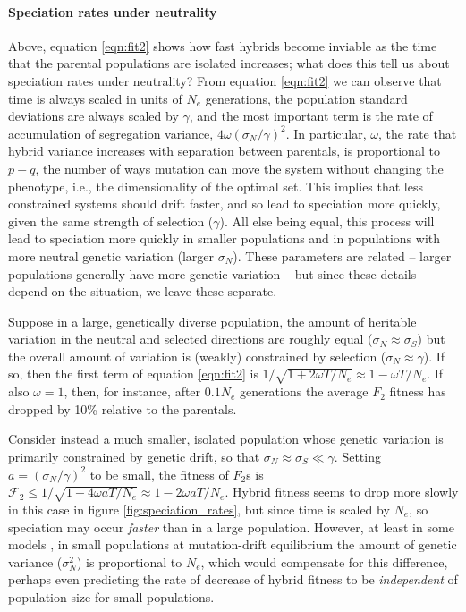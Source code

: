 \documentclass{article}
\newcommand{\plr}[1]{\todo[color=blue!25]{#1}}
\newcommand{\plr}[1]{{\color{blue}\it #1}}
\newcommand{\1}{\mathbbm{1}}
\newcommand{\fit}{\mathcal{F}}
\begin{document}
\paragraph{Speciation rates under neutrality}
Above, equation \eqref{eqn:fit2} shows how fast hybrids become inviable 
as the time that the parental populations are isolated increases;
what does this tell us about speciation rates under neutrality?
From equation \eqref{eqn:fit2} we can observe that
time is always scaled in units of $N_e$ generations,
the population standard deviations are always scaled by $\gamma$,
and the most important term is the rate of accumulation of segregation variance,
$4 \omega (\sigma_N/\gamma)^2$.
In particular, $\omega$, the rate that hybrid variance increases with separation between parentals,
is proportional to $p-q$, the number of ways mutation can move the system without changing the phenotype,
i.e., the dimensionality of the optimal set.
This implies that less constrained systems should drift faster,
and so lead to speciation more quickly, given the same strength of selection ($\gamma$).
\plr{revisit}
All else being equal, this process will lead to speciation more quickly in smaller populations
and in populations with more neutral genetic variation (larger $\sigma_N$).
These parameters are related -- larger populations generally have more genetic variation --
but since these details depend on the situation, we leave these separate.

Suppose in a large, genetically diverse population,
the amount of heritable variation in the neutral and selected directions are roughly equal 
($\sigma_N \approx \sigma_S$)
but the overall amount of variation is (weakly) constrained by selection
($\sigma_N \approx \gamma$).
If so, then the first term of equation \eqref{eqn:fit2} is
$1/\sqrt{1 + 2 \omega T/N_e} \approx 1 - \omega T/N_e$.
If also $\omega=1$, then, for instance, after $0.1 N_e$ generations
the average $F_2$ fitness has dropped by 10\% relative to the parentals.

Consider instead a much smaller, isolated population
whose genetic variation is primarily constrained by genetic drift,
so that $\sigma_N \approx \sigma_S \ll \gamma$.
Setting $a = (\sigma_N/\gamma)^2$ to be small,
the fitness of $F_2$s is $\fit_2 \le 1/\sqrt{1 + 4 \omega a T/N_e} \approx 1 - 2 \omega a T/N_e$.
Hybrid fitness seems to drop more slowly in this case in figure \ref{fig:speciation_rates},
but since time is scaled by $N_e$, so speciation may occur \emph{faster} than in a large population.
However, at least in some models \citep{bartonXXX}, in small populations at mutation-drift equilibrium
the amount of genetic variance ($\sigma_N^2$) is proportional to $N_e$,
which would compensate for this difference, 
perhaps even predicting the rate of decrease of hybrid fitness to be \emph{independent} of population size
for small populations.
\end{document}
